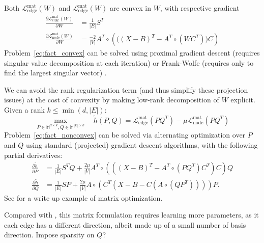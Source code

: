 Both $\mathcal{L}_{\mathrm{edge}}^{\mathrm{mat}}(W)$ and
$\mathcal{L}_{\mathrm{edge}}^{\mathrm{mat}}(W)$ are convex in $W$, with respective gradient
\begin{align*}
  \frac{\partial \mathcal{L}_{\mathrm{edge}}^{\mathrm{mat}}(W)}{\partial W} &=
  \frac{1}{|E|} S^T \\
  \frac{\partial \mathcal{L}_{\mathrm{node}}^{\mathrm{mat}}(W)}{\partial W} &= \frac{-2}{|V|}
  A^T \circ \left(\Big(\left(X-B\right)^T -A^T \circ \left(W C^T\right) \Big) C\right)
\end{align*}
Problem~\eqref{eq:fact_convex} can be solved using proximal gradient descent (requires singular
value decomposition at each iteration) \autocite{Parikh2013a} or Frank-Wolfe (requires only to find
the largest singular vector) \autocite{Jaggi2013a}.
\fi

We can avoid the rank regularization term (and thus simplify these projection issues) at the cost of
convexity by making low-rank decomposition of $W$ explicit. Given a rank $k\leq \min(d,|E|)$:
\begin{equation}
  \label{eq:fact_nonconvex}
  \max_{P\in\mathbb{M}^{d\times k}, Q\in\mathbb{M}^{|E|\times k}} \quad \tilde{h}(P, Q) =
  \mathcal{L}_{\mathrm{edge}}^{\mathrm{mat}}(PQ^T) -
  \mu \mathcal{L}_{\mathrm{node}}^{\mathrm{mat}}(PQ^T)
\end{equation}
Problem~\eqref{eq:fact_nonconvex} can be solved via alternating optimization over $P$ and $Q$ using
standard (projected) gradient descent algorithms, with the following partial derivatives:
\begin{align*}
  \frac{\partial \tilde{h}}{\partial P} &=
  \frac{1}{|E|} S^T Q + \frac{2\mu}{|V|}
  A^T \circ (((X-B)^T -A^T \circ (PQ^T )C^T )C)Q 
  \\
  \frac{\partial \tilde{h}}{\partial Q} &=
  \frac{1}{|E|} S P + \frac{2\mu}{|V|}
  A\circ (C^T (X-B-C(A\circ (QP^T ))))P.
\end{align*}
See \autocite[Section 6]{attributedSNE17} for a write up example of matrix optimization.

Compared with , this matrix formulation requires learning more parameters, as it
each edge has a different direction, albeit made up of a small number of basis direction.  Impose
sparsity on $Q$?

